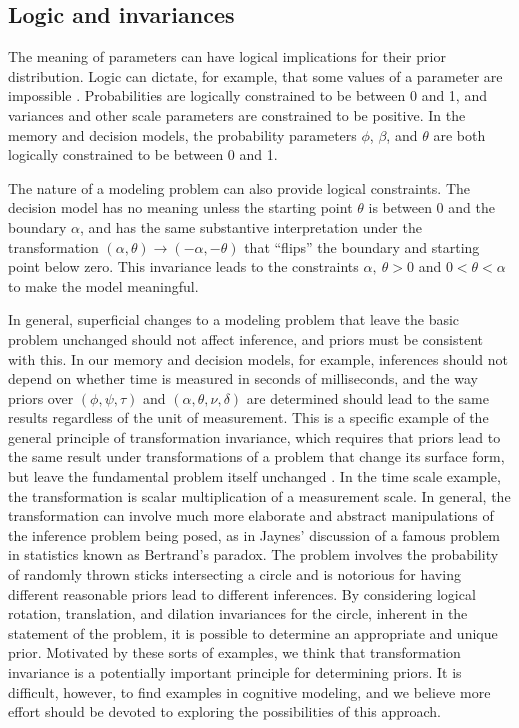 \subsection{Logic and invariances} 

The meaning of parameters can have logical implications for their prior distribution. Logic can dictate, for example, that some values of a parameter are impossible \cite{Taagepera2007}. Probabilities are logically constrained to be between 0 and 1, and variances and other scale parameters are constrained to be positive. In the memory and decision models, the probability parameters $\phi$, $\beta$, and $\theta$ are both logically constrained to be between 0 and 1. 

The nature of a modeling problem can also provide logical constraints. The decision model has no meaning unless the starting point $\theta$ is between 0 and the boundary $\alpha$, and has the same substantive interpretation under the transformation $\left(\alpha,\theta\right)\rightarrow\left(-\alpha,-\theta\right)$ that ``flips'' the boundary and starting point below zero. This invariance leads to the constraints $\alpha,\ \theta > 0$ and $0 < \theta < \alpha$ to make the model meaningful.

In general, superficial changes to a modeling problem that leave the basic problem unchanged should not affect inference, and priors must be consistent with this. In our memory and decision models, for example, inferences should not depend on whether time is measured in seconds of milliseconds, and the way priors over $\left(\phi,\psi,\tau\right)$ and $\left(\alpha,\theta,\nu,\delta\right)$ are determined should lead to the same results regardless of the unit of measurement. This is a specific example of the general principle of transformation invariance, which requires that priors lead to the same result under transformations of a problem that change its surface form, but leave the fundamental problem itself unchanged \cite{LeeWagenmakers2005}. In the time scale example, the transformation is scalar multiplication of a measurement scale. In general, the transformation can involve much more elaborate and abstract manipulations of the inference problem being posed, as in Jaynes' \citeyear[Ch. 12]{Jaynes2003} discussion of a famous problem in statistics known as Bertrand's paradox. The problem involves the probability of randomly thrown sticks intersecting a circle and is notorious for having different reasonable priors lead to different inferences. By considering logical rotation, translation, and dilation invariances for the circle, inherent in the statement of the problem, it is possible to determine an appropriate and unique prior. Motivated by these sorts of examples, we think that transformation invariance is a potentially important principle for determining priors. It is difficult, however, to find examples in cognitive modeling, and we believe more effort should be devoted to exploring the possibilities of this approach.


